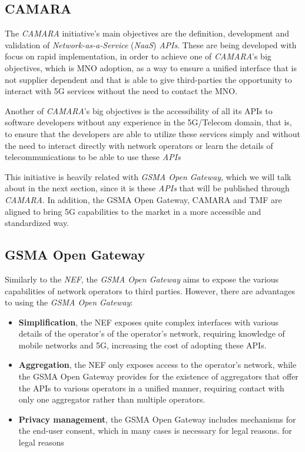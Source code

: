 \subsection{CAMARA}

The \emph{CAMARA} initiative's main objectives are the
definition, development and validation of
\emph{Network-as-a-Service} (\emph{NaaS}) \emph{APIs}. These are
being developed with focus on rapid implementation, in order to
achieve one of \emph{CAMARA}'s big objectives, which is MNO
adoption, as a way to ensure a unified interface that is not
supplier dependent and that is able to give third-parties the
opportunity to interact with 5G services without the need to
contact the MNO.

Another of \emph{CAMARA}'s big objectives is the accessibility of
all its APIs to software developers without any experience in the
5G/Telecom domain, that is, to ensure that the developers are
able to utilize these services simply and without the need to
interact directly with network operators or learn the details of
telecommunications to be able to use these \emph{APIs} 

This initiative is heavily related with \emph{GSMA Open Gateway},
which we will talk about in the next section, since it is these
\emph{APIs} that will be published through \emph{CAMARA}. In
addition, the GSMA Open Gateway, CAMARA and TMF are aligned to
bring 5G capabilities to the market in a more accessible and
standardized way.


\subsection{GSMA Open Gateway}

Similarly to the \emph{NEF}, the \emph{GSMA Open Gateway} aims to
expose the various capabilities of network operators to third
parties. However, there are advantages to using the \emph{GSMA
Open Gateway}:

\begin{itemize} \item \textbf{Simplification}, the NEF exposes
      quite complex interfaces with various details of the
      operator's  of the operator's network, requiring knowledge
      of mobile networks and 5G, increasing the cost of adopting
      these APIs.

    \item \textbf{Aggregation}, the NEF only exposes access to
      the operator's network, while the GSMA Open Gateway
      provides for the existence of aggregators that offer the
      APIs to various operators in a unified manner, requiring
      contact with only one aggregator rather than multiple
      operators.

\item \textbf{Privacy management}, the GSMA Open Gateway includes
mechanisms for the end-user consent, which in many cases is
necessary for legal reasons. for legal reasons \end{itemize}

